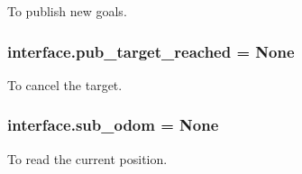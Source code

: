 To publish new goals. 

\subsubsection[{\texorpdfstring{pub\+\_\+target\+\_\+reached}{pub_target_reached}}]{\setlength{\rightskip}{0pt plus 5cm}interface.\+pub\+\_\+target\+\_\+reached = None}\hypertarget{namespaceinterface_a4709d1a9f45323d007767a3b7c4725f5}{}\label{namespaceinterface_a4709d1a9f45323d007767a3b7c4725f5}


To cancel the target. 

\subsubsection[{\texorpdfstring{sub\+\_\+odom}{sub_odom}}]{\setlength{\rightskip}{0pt plus 5cm}interface.\+sub\+\_\+odom = None}\hypertarget{namespaceinterface_ac9f12ff0de8248506bf532b6874750e7}{}\label{namespaceinterface_ac9f12ff0de8248506bf532b6874750e7}


To read the current position. 

